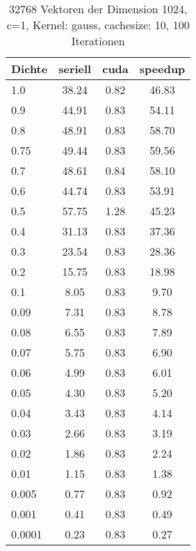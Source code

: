 \documentclass{scrartcl}
\begin{document}
\begin{table}
\begin{center}
\begin{tabular}{|l|c|c|c|}
\hline
Dichte & seriell & cuda & speedup \\
\hline
1.0 & 38.24 & 0.82 & 46.83 \\
0.9 & 44.91 & 0.83 & 54.11 \\
0.8 & 48.91 & 0.83 & 58.70 \\
0.75 & 49.44 & 0.83 & 59.56 \\
0.7 & 48.61 & 0.84 & 58.10 \\
0.6 & 44.74 & 0.83 & 53.91 \\
0.5 & 57.75 & 1.28 & 45.23 \\
0.4 & 31.13 & 0.83 & 37.36 \\
0.3 & 23.54 & 0.83 & 28.36 \\
0.2 & 15.75 & 0.83 & 18.98 \\
0.1 & 8.05 & 0.83 & 9.70 \\
0.09 & 7.31 & 0.83 & 8.78 \\
0.08 & 6.55 & 0.83 & 7.89 \\
0.07 & 5.75 & 0.83 & 6.90 \\
0.06 & 4.99 & 0.83 & 6.01 \\
0.05 & 4.30 & 0.83 & 5.20 \\
0.04 & 3.43 & 0.83 & 4.14 \\
0.03 & 2.66 & 0.83 & 3.19 \\
0.02 & 1.86 & 0.83 & 2.24 \\
0.01 & 1.15 & 0.83 & 1.38 \\
0.005 & 0.77 & 0.83 & 0.92 \\
0.001 & 0.41 & 0.83 & 0.49 \\
0.0001 & 0.23 & 0.83 & 0.27 \\
\hline
\end{tabular}
\end{center}
\caption{ 32768 Vektoren der Dimension 1024, c=1, Kernel: gauss, cachesize: 10, 100 Iterationen}
\end{table}
\end{document}
